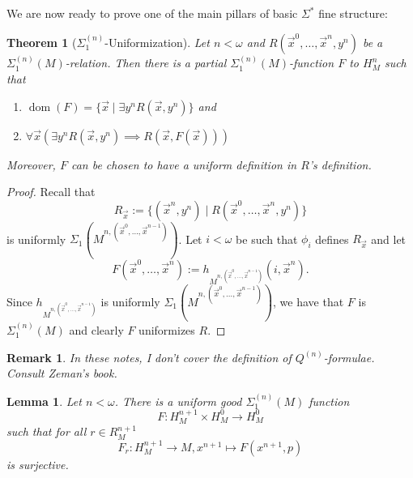 \documentclass[12pt,a4paper]{article}
\theoremstyle{nicestyle}
\newtheorem{theorem}{Theorem}[subsection]
\newtheorem{lemma}{Lemma}[subsection]
\newtheorem{remark}{Remark}[subsection]
\DeclareMathOperator{\dom}{dom}
\begin{document}
We are now ready to prove one of the main pillars of basic
$\Sigma^{*}$ fine structure:

\begin{theorem}[$\Sigma^{(n)}_{1}$-Uniformization]
  Let $n < \omega$ and $R(\vec{x}^{0}, \ldots, \vec{x}^{n}, y^n)$ be a
  $\Sigma^{(n)}_1(M)$-relation. Then there is a partial
  $\Sigma^{(n)}_1(M)$-function $F$ to $H^n_M$ such that
  \begin{enumerate}
  \item $\dom(F) = \{ \vec{x} \mid \exists y^{n} R(\vec{x}, y^{n}) \}$ and
  \item
    $\forall \vec{x} ( \exists y^{n} R(\vec{x}, y^{n}) \implies
    R(\vec{x}, F(\vec{x})))$
  \end{enumerate}
  Moreover, $F$ can be chosen to have a uniform definition in $R$'s
  definition.
\end{theorem}

\begin{proof}
  Recall that
  \[
    R_{\vec{x}} := \{ (\vec{x}^{n}, y^{n}) \mid R(\vec{x}^{0}, \ldots,
    \vec{x}^{n}, y^{n}) \}
  \]
  is uniformly
  $\Sigma_1(M^{n, (\vec{x}^{0}, \ldots, \vec{x}^{n-1})})$. Let
  $i < \omega$ be such that $\phi_i$ defines $R_{\vec{x}}$ and let
  \[
    F(\vec{x}^{0}, \ldots, \vec{x}^{n}) := h_{M^{n, (\vec{x}^{0},
        \ldots, \vec{x}^{n-1})}}(i, \vec{x}^{n}).
  \]
  Since $h_{M^{n, (\vec{x}^{0}, \ldots, \vec{x}^{n-1})}}$ is uniformly
  $\Sigma_1(M^{n, (\vec{x}^{0}, \ldots, \vec{x}^{n-1})})$, we have
  that $F$ is $\Sigma^{(n)}_1(M)$ and clearly $F$ uniformizes $R$.
\end{proof}

\begin{remark}
  In these notes, I don't cover the definition of
  $Q^{(n)}$-formulae. Consult Zeman's book.
\end{remark}

\begin{lemma} \label{lemma:Skolem functions}
  Let $n < \omega$. There is a uniform good $\Sigma^{(n)}_{1}(M)$ function
  \[
    F \colon H^{n+1}_{M} \times H^{0}_{M} \to H^{0}_{M}
  \]
  such that for all $r \in R^{n+1}_{M}$
  \[
    F_{r} \colon H^{n+1}_{M} \to M, x^{n+1} \mapsto F(x^{n+1}, p)
  \]
  is surjective.
\end{lemma}
\end{document}
